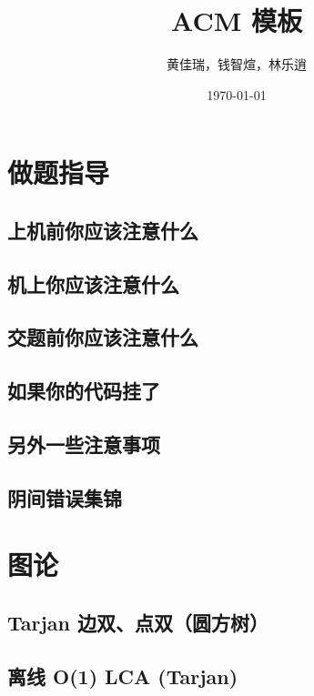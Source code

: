 \documentclass[12pt, a4paper, oneside]{ctexart}
\title{ACM 模板}
\author{黄佳瑞，钱智煊，林乐逍}
\date{\today}
\begin{document}
    \scriptsize
    \maketitle
    \newpage
    
    \begin{multicols}{2}
        \tableofcontents
        \newpage

        \section{做题指导}
        \subsection{上机前你应该注意什么}
        
        \subsection{机上你应该注意什么}
        
        \subsection{交题前你应该注意什么}
        
        \subsection{如果你的代码挂了}
        
        \subsection{另外一些注意事项}
        
        \subsection{阴间错误集锦}
        
        \newpage

        \section{图论}
        \subsection{Tarjan 边双、点双（圆方树）}
        
        \subsection{离线 O(1) LCA (Tarjan)}
        


\end{multicols}
\end{document}
